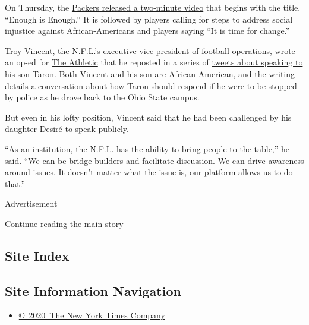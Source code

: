 On Thursday, the
\href{https://twitter.com/packers/status/1268539283591356416}{Packers
released a two-minute video} that begins with the title, ``Enough is
Enough.'' It is followed by players calling for steps to address social
injustice against African-Americans and players saying ``It is time for
change.''

Troy Vincent, the N.F.L.'s executive vice president of football
operations, wrote an op-ed for
\href{https://theathletic.com/1850491/2020/06/03/op-ed-enough-troy-vincent-sr-on-harnessing-this-moment-to-change-the-future/?source=rss}{The
Athletic} that he reposted in a series of
\href{https://twitter.com/TroyVincentSr/status/1268269339364347905}{tweets
about speaking to his son} Taron. Both Vincent and his son are
African-American, and the writing details a conversation about how Taron
should respond if he were to be stopped by police as he drove back to
the Ohio State campus.

But even in his lofty position, Vincent said that he had been challenged
by his daughter Desiré to speak publicly.

``As an institution, the N.F.L. has the ability to bring people to the
table,'' he said. ``We can be bridge-builders and facilitate discussion.
We can drive awareness around issues. It doesn't matter what the issue
is, our platform allows us to do that.''

Advertisement

\protect\hyperlink{after-bottom}{Continue reading the main story}

\hypertarget{site-index}{%
\subsection{Site Index}\label{site-index}}

\hypertarget{site-information-navigation}{%
\subsection{Site Information
Navigation}\label{site-information-navigation}}

\begin{itemize}
\tightlist
\item
  \href{https://help.nytimes3xbfgragh.onion/hc/en-us/articles/115014792127-Copyright-notice}{©~2020~The
  New York Times Company}
\end{itemize}

